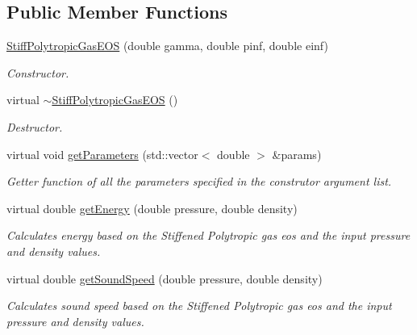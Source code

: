 \subsection*{Public Member Functions}
\begin{DoxyCompactItemize}
\item 
\hyperlink{classStiffPolytropicGasEOS_a365767d18a528ef0c32502ec990b9f62}{Stiff\-Polytropic\-Gas\-E\-O\-S} (double gamma, double pinf, double einf)
\begin{DoxyCompactList}\small\item\em Constructor. \end{DoxyCompactList}\item 
\hypertarget{classStiffPolytropicGasEOS_a6ba4ff9bbd86a79f0703b6f942e73b00}{virtual \hyperlink{classStiffPolytropicGasEOS_a6ba4ff9bbd86a79f0703b6f942e73b00}{$\sim$\-Stiff\-Polytropic\-Gas\-E\-O\-S} ()}\label{classStiffPolytropicGasEOS_a6ba4ff9bbd86a79f0703b6f942e73b00}

\begin{DoxyCompactList}\small\item\em Destructor. \end{DoxyCompactList}\item 
virtual void \hyperlink{classStiffPolytropicGasEOS_a057063a50050f30de6a5793d2f56c612}{get\-Parameters} (std\-::vector$<$ double $>$ \&params)
\begin{DoxyCompactList}\small\item\em Getter function of all the parameters specified in the construtor argument list. \end{DoxyCompactList}\item 
virtual double \hyperlink{classStiffPolytropicGasEOS_a6be8bc169c83f75a9fe3a0bd98b6b689}{get\-Energy} (double pressure, double density)
\begin{DoxyCompactList}\small\item\em Calculates energy based on the Stiffened Polytropic gas eos and the input pressure and density values. \end{DoxyCompactList}\item 
virtual double \hyperlink{classStiffPolytropicGasEOS_aa780e1c650fa9df18133f38d4e8fbae6}{get\-Sound\-Speed} (double pressure, double density)
\begin{DoxyCompactList}\small\item\em Calculates sound speed based on the Stiffened Polytropic gas eos and the input pressure and density values. \end{DoxyCompactList}\end{DoxyCompactItemize}
